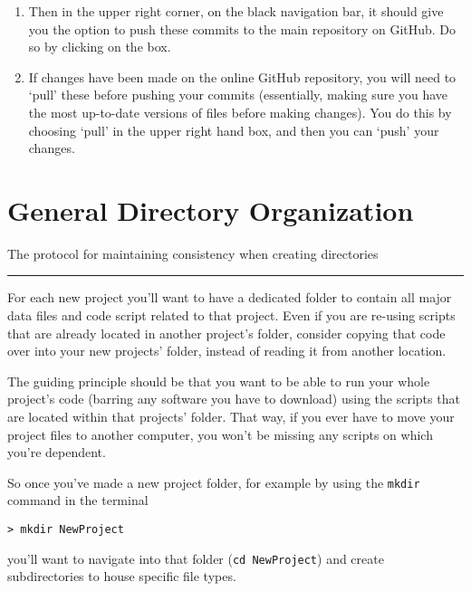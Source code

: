 \documentclass[
  letterpaper,
  DIV=11,
  numbers=noendperiod]{scrreprt}
\begin{document}
\begin{enumerate}
\def\labelenumi{\arabic{enumi}.}
\item
  Then in the upper right corner, on the black navigation bar, it should
  give you the option to push these commits to the main repository on
  GitHub. Do so by clicking on the box.
\item
  If changes have been made on the online GitHub repository, you will
  need to `pull' these before pushing your commits (essentially, making
  sure you have the most up-to-date versions of files before making
  changes). You do this by choosing `pull' in the upper right hand box,
  and then you can `push' your changes.
\end{enumerate}

\hypertarget{general-directory-organization}{%
\chapter{General Directory
Organization}\label{general-directory-organization}}

The protocol for maintaining consistency when creating directories

\begin{center}\rule{0.5\linewidth}{0.5pt}\end{center}

For each new project you'll want to have a dedicated folder to contain
all major data files and code script related to that project. Even if
you are re-using scripts that are already located in another project's
folder, consider copying that code over into your new projects' folder,
instead of reading it from another location.

The guiding principle should be that you want to be able to run your
whole project's code (barring any software you have to download) using
the scripts that are located within that projects' folder. That way, if
you ever have to move your project files to another computer, you won't
be missing any scripts on which you're dependent.

So once you've made a new project folder, for example by using the
\texttt{mkdir} command in the terminal

\begin{verbatim}
> mkdir NewProject
\end{verbatim}

you'll want to navigate into that folder (\texttt{cd\ NewProject}) and
create subdirectories to house specific file types.
\end{document}
